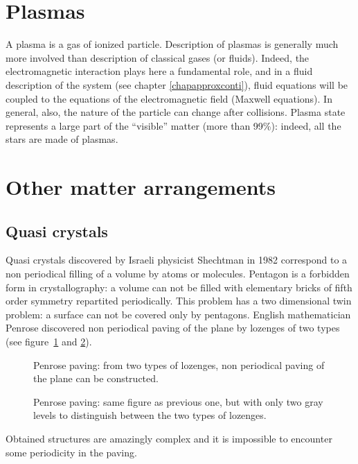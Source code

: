 \documentclass[12pt]{book}
\begin{document}
\section{Plasmas}
A plasma is a gas of ionized particle. Description of plasmas is
generally much more involved than description of classical gases (or
fluids). Indeed, the electromagnetic interaction plays here a
fundamental role, and in a fluid description of the system (see
chapter \ref{chapapproxconti}), fluid equations will be coupled to the
equations of the electromagnetic field (Maxwell equations). In
general, also, the nature of the particle can change after collisions.
Plasma state represents a large part of the ``visible'' matter (more than
99\%): indeed, all the stars are made of plasmas.

\section{Other matter arrangements}
\subsection{Quasi crystals}
Quasi crystals \cite{ph:quasi:Jaric88}
discovered by Israeli physicist  Shechtman in 1982 correspond to a non
periodical filling of a volume by atoms or molecules. Pentagon is a forbidden
form in crystallography: a volume can not be filled with elementary bricks of
fifth order symmetry repartited periodically. This problem has a two dimensional
twin problem: a surface can not be covered only by pentagons.
English mathematician Penrose discovered non
periodical paving 
of the  plane by lozenges of two types (see figure~\ref{figpenrose} and \ref{figpenrose2}). 
\begin{figure}[htb]
 \centerline{}   
 \caption{Penrose paving: from two types of lozenges, non periodical paving of
   the plane can be constructed.}
 \label{figpenrose}
\end{figure}
\begin{figure}[htb]
 \centerline{}   
 \caption{Penrose paving: same figure as previous one, but with only two gray
   levels to distinguish between the two types of lozenges.}
 \label{figpenrose2}
\end{figure}
Obtained structures are amazingly complex and it is impossible to
encounter some periodicity in the paving. 
\end{document}
